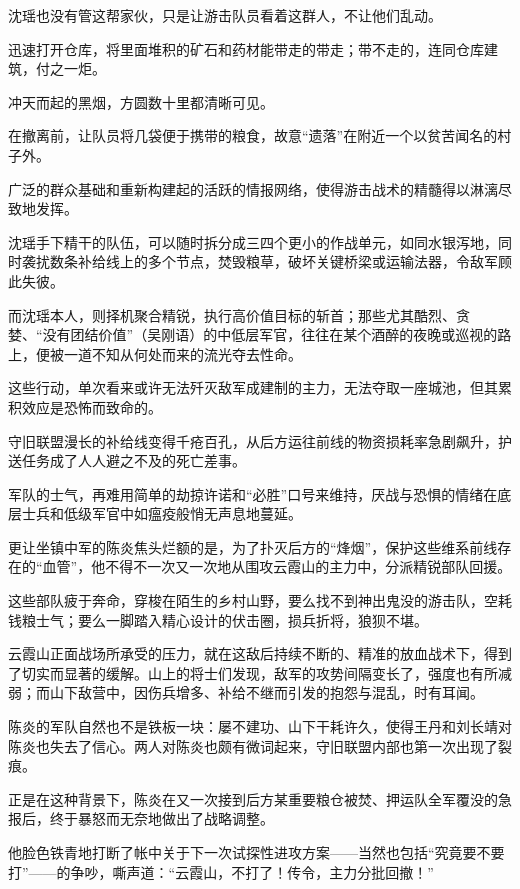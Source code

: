 沈瑶也没有管这帮家伙，只是让游击队员看着这群人，不让他们乱动。

迅速打开仓库，将里面堆积的矿石和药材能带走的带走；带不走的，连同仓库建筑，付之一炬。

冲天而起的黑烟，方圆数十里都清晰可见。

在撤离前，让队员将几袋便于携带的粮食，故意“遗落”在附近一个以贫苦闻名的村子外。

\vspace{2em}

广泛的群众基础和重新构建起的活跃的情报网络，使得游击战术的精髓得以淋漓尽致地发挥。

沈瑶手下精干的队伍，可以随时拆分成三四个更小的作战单元，如同水银泻地，同时袭扰数条补给线上的多个节点，焚毁粮草，破坏关键桥梁或运输法器，令敌军顾此失彼。

而沈瑶本人，则择机聚合精锐，执行高价值目标的斩首；那些尤其酷烈、贪婪、“没有团结价值”（吴刚语）的中低层军官，往往在某个酒醉的夜晚或巡视的路上，便被一道不知从何处而来的流光夺去性命。

这些行动，单次看来或许无法歼灭敌军成建制的主力，无法夺取一座城池，但其累积效应是恐怖而致命的。

守旧联盟漫长的补给线变得千疮百孔，从后方运往前线的物资损耗率急剧飙升，护送任务成了人人避之不及的死亡差事。

军队的士气，再难用简单的劫掠许诺和“必胜”口号来维持，厌战与恐惧的情绪在底层士兵和低级军官中如瘟疫般悄无声息地蔓延。

更让坐镇中军的陈炎焦头烂额的是，为了扑灭后方的“烽烟”，保护这些维系前线存在的“血管”，他不得不一次又一次地从围攻云霞山的主力中，分派精锐部队回援。

这些部队疲于奔命，穿梭在陌生的乡村山野，要么找不到神出鬼没的游击队，空耗钱粮士气；要么一脚踏入精心设计的伏击圈，损兵折将，狼狈不堪。

云霞山正面战场所承受的压力，就在这敌后持续不断的、精准的放血战术下，得到了切实而显著的缓解。山上的将士们发现，敌军的攻势间隔变长了，强度也有所减弱；而山下敌营中，因伤兵增多、补给不继而引发的抱怨与混乱，时有耳闻。

陈炎的军队自然也不是铁板一块：屡不建功、山下干耗许久，使得王丹和刘长靖对陈炎也失去了信心。两人对陈炎也颇有微词起来，守旧联盟内部也第一次出现了裂痕。

正是在这种背景下，陈炎在又一次接到后方某重要粮仓被焚、押运队全军覆没的急报后，终于暴怒而无奈地做出了战略调整。

他脸色铁青地打断了帐中关于下一次试探性进攻方案——当然也包括“究竟要不要打”——的争吵，嘶声道：“云霞山，不打了！传令，主力分批回撤！”

